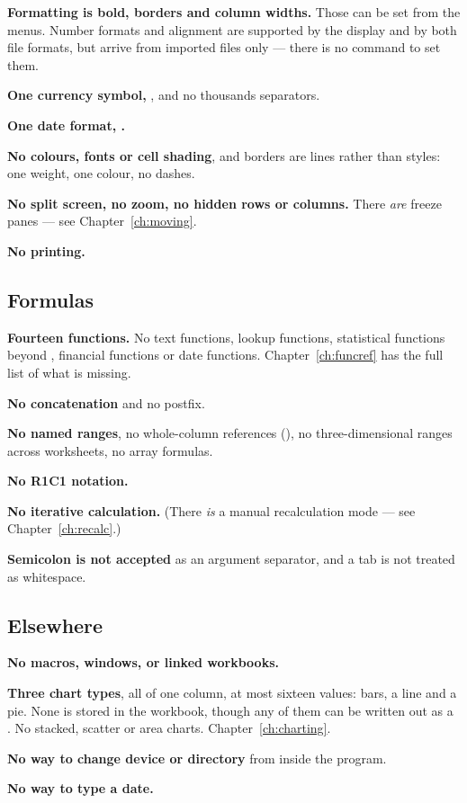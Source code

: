 \begin{ccsteps}
\item \textbf{Formatting is bold, borders and column widths.} Those can be
set from the menus. Number formats and alignment are supported by the display
and by both file formats, but arrive from imported files only --- there is no
command to set them.
\item \textbf{One currency symbol, \lit{\$}}, and no thousands separators.
\item \textbf{One date format, .}
\item \textbf{No colours, fonts or cell shading}, and borders are lines
rather than styles: one weight, one colour, no dashes.
\item \textbf{No split screen, no zoom, no hidden rows or columns.} There
\emph{are} freeze panes --- see Chapter~\ref{ch:moving}.
\item \textbf{No printing.}
\end{ccsteps}

\subsection{Formulas}

\begin{ccsteps}
\item \textbf{Fourteen functions.} No text functions, lookup functions,
statistical functions beyond , financial functions or date
functions. Chapter~\ref{ch:funcref} has the full list of what is missing.
\item \textbf{No \lit{\&} concatenation} and no \lit{\%} postfix.
\item \textbf{No named ranges}, no whole-column references (), no
three-dimensional ranges across worksheets, no array formulas.
\item \textbf{No R1C1 notation.}
\item \textbf{No iterative calculation.} (There \emph{is} a manual
recalculation mode --- see Chapter~\ref{ch:recalc}.)
\item \textbf{Semicolon is not accepted} as an argument separator, and a tab is
not treated as whitespace.
\end{ccsteps}

\subsection{Elsewhere}

\begin{ccsteps}
\item \textbf{No macros, windows, or linked workbooks.}
\item \textbf{Three chart types}, all of one column, at most sixteen values:
bars, a line and a pie. None is stored in the workbook, though any of them can
be written out as a . No stacked, scatter or area charts.
Chapter~\ref{ch:charting}.
\item \textbf{No way to change device or directory} from inside the program.
\item \textbf{No way to type a date.}
\end{ccsteps}

